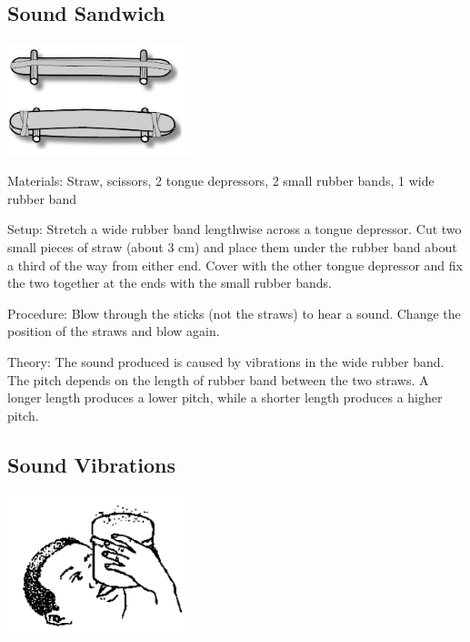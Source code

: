 \begin{multicols}{2}
\subsection{Sound Sandwich}

\begin{center}
\includegraphics[width=0.4\textwidth]{./img/sound-sandwich.jpg}
\end{center}

\begin{description*}
\item[Materials:]{Straw, scissors, 2 tongue depressors, 2 small rubber bands, 1 wide rubber band}
\item[Setup:]{Stretch a wide rubber band lengthwise across a tongue depressor. Cut two small pieces of straw (about 3 cm) and place them under the rubber band about a third of the way from either end. Cover with the other tongue depressor and fix the two together at the ends with the small rubber bands.}
\item[Procedure:]{Blow through the sticks (not the straws) to hear a sound. Change the position of the straws and blow again.}
\item[Theory:]{The sound produced is caused by vibrations in the wide rubber band. The pitch depends on the length of rubber band between the two straws. A longer length produces a lower pitch, while a shorter length produces a higher pitch.}
\end{description*}

\subsection{Sound Vibrations}

\begin{center}
\includegraphics[width=0.4\textwidth]{./img/source/sound-vibrations.png}
\end{center}


\end{multicols}
